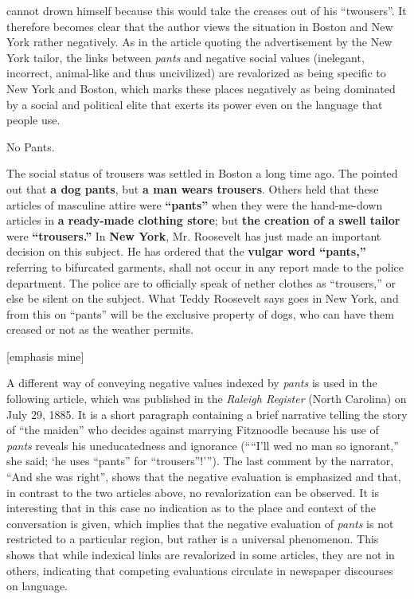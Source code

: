 cannot drown himself because this would take the creases out of his “twousers”. It therefore becomes clear that the author views the situation in Boston and New York rather negatively. As in the article quoting the advertisement by the New York tailor, the links between \emph{pants} and negative social values (inelegant, incorrect, animal-like and thus uncivilized) are revalorized as being specific to New York and Boston, which marks these places negatively as being dominated by a social and political elite that exerts its power even on the language that people use.

\begin{ipquote}
\begin{center}
No Pants.    
\end{center}
{The social status of trousers was settled in Boston a long time ago. The  pointed out that \textbf{a dog pants}, but \textbf{a man wears trousers}. Others held that these articles of masculine attire were \textbf{“pants”} when they were the hand-me-down articles in \textbf{a ready-made clothing store}; but \textbf{the creation of a swell tailor} were \textbf{“trousers.”} In \textbf{New York}, Mr. Roosevelt has just made an important decision on this subject. He has ordered that the \textbf{vulgar word “pants,”} referring to bifurcated garments, shall not occur in any report made to the police department. The police are to officially speak of nether clothes as “trousers,” or else be silent on the subject. What Teddy Roosevelt says go{\kern0pt}es in New York, and from this on “pants” will be the exclusive property of dogs, who can have them creased or not as the weather permits.

\raggedleft
{[emphasis mine]}\\
}
\end{ipquote}

A different way of conveying negative values indexed by \emph{pants} is used in the following article, which was published in the \emph{Raleigh Register} (North Carolina) on July 29, 1885. It is a short paragraph containing a brief narrative telling the story of “the maiden” who decides against marrying Fitznoodle because his use of \emph{pants} reveals his uneducatedness and ignorance (““I’ll wed no man so ignorant,” she said; ‘he uses “pants” for “trousers”!’”).  The last comment by the narrator, “And she was right”, shows that the negative evaluation is emphasized and that, in contrast to the two articles above, no revalorization can be observed. It is interesting that in this case no indication as to the place and context of the conversation is given, which implies that the negative evaluation of \emph{pants} is not restricted to a particular region, but rather is a universal phenomenon. This shows that while indexical links are revalorized in some articles, they are not in others, indicating that competing evaluations circulate in newspaper discourses on language.

